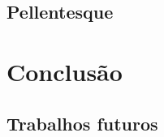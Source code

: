 \lipsum[21-22]


\section{Pellentesque}

\lipsum[24]


\chapter{Conclusão}

\lipsum[11-12]


\section{Trabalhos futuros}

\lipsum[21-22]








